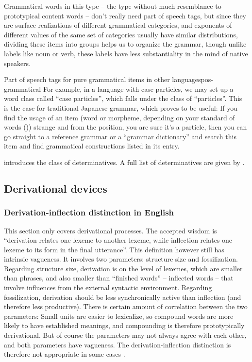 \documentclass[UTF8, a4paper, oneside, scheme=plain]{ctexrep}
\newcommand*{\citepage}[1]{p.~{#1}}
\begin{document}
Grammatical words in this type -- the type without much resemblance to prototypical content words -- 
don't really need part of speech tags,
but since they are surface realizations of different grammatical categories,
and exponents of different values of the same set of categories 
usually have similar distributions,
dividing these items into groups helps us to organize the grammar,
though unlike labels like noun or verb,
these labels have less substantiality in the mind of native speakers.

\begin{infobox}{Part of speech tags for pure grammatical items in other languages}{pos-grammatical}
    For example, in a language with case particles,
    we may set up a word class called ``case particles'',
    which falls under the class of ``particles''.
    This is the case for traditional Japanese grammar,
    which proves to be useful:
    If you find the usage of an item (word or morpheme, 
    depending on your standard of words ())
    strange and from the position,
    you are sure it's a particle,
    then you can go straight to a reference grammar or a ``grammar dictionary''
    and search this item and find grammatical constructions listed in its entry.
\end{infobox}

\citet[\citepage{330}]{cgel} introduces the class of determinatives.
A full list of determinatives are given by \citet[\citepage{356}]{cgel}.

\subsection{Derivational devices}

\subsubsection{Derivation-inflection distinction in English}

This section only covers derivational processes.
The accepted wisdom is ``derivation relates one lexeme to another lexeme,
while inflection relates one lexeme to its form in the final utterance''.
This definition however still has intrinsic vagueness.
It involves two parameters:
structure size
and fossilization.
Regarding structure size,
derivation is on the level of lexemes,
which are smaller than phrases,
and also smaller than ``finished words'' -- inflected words -- 
that involve influences from the external syntactic environment.
Regarding fossilization, 
derivation should be less synchronically active than inflection
(and therefore less productive).
There is certain amount of correlation between the two parameters:
Small units are easier to lexicalize, 
so compound words are more likely to have established meanings,
and compounding is therefore prototypically derivational.
But of course the parameters may not always agree with each other,
and both parameters have vagueness.
The derivation-inflection distinction is therefore not appropriate 
in some cases \citep[\citepage{221}]{dixon2009basic1}.
\end{document}
